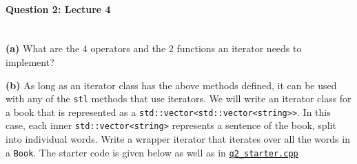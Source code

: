 \documentclass[12pt,letterpaper,twoside]{article}
\begin{document}
\paragraph{Question 2: Lecture 4}
\quad \\
\textbf{(a)} What are the 4 operators and the 2 functions an iterator needs to implement?

\begin{solution}

\end{solution}

\textbf{(b)} As long as an iterator class has the above methods defined, it can be used with any of the \texttt{stl} methods that use iterators. We will write an iterator class for a book that is represented as a \texttt{std::vector<std::vector<string>>}. In this case, each inner \texttt{std::vector<string>} represents a sentence of the book, split into individual words. Write a wrapper iterator that iterates over all the words in a \texttt{Book}. The starter code is given below as well as in \href{https://github.com/cme212/CME212-2020/blob/master/EX1/q2_starter.cpp}{\texttt{q2\_starter.cpp}}
\end{document}
